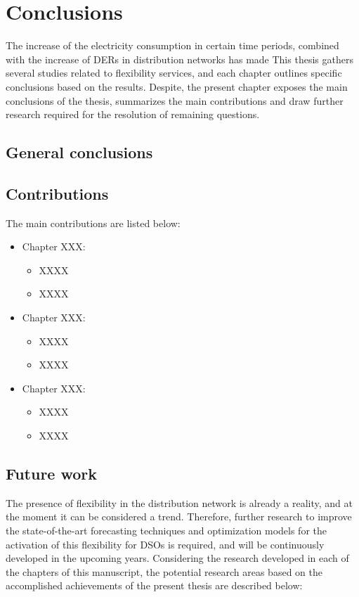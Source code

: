 
\chapter{Conclusions}
\label{conclus}
    The increase of the electricity consumption in certain time periods, combined with the increase of DERs in distribution networks has made 
    This thesis gathers several studies related to flexibility services, and each chapter outlines specific conclusions based on the results. Despite, the present chapter exposes the main conclusions of the thesis, summarizes the main contributions and draw further research required for the resolution of remaining questions. 

\section{General conclusions}
	
    
     
\section{Contributions}
The main contributions are listed below: 
\begin{itemize}
\item Chapter XXX: 
	\begin{itemize}
		\item XXXX
		\item XXXX
	\end{itemize}
\item Chapter XXX: 
	\begin{itemize}
		\item XXXX
		\item XXXX
	\end{itemize}
\item Chapter XXX: 
	\begin{itemize}
		\item XXXX
		\item XXXX
	\end{itemize}
\end{itemize}
	


\section{Future work}
The presence of flexibility in the distribution network is already a reality, and at the moment it can be considered a trend. Therefore, further research to improve the state-of-the-art forecasting techniques and optimization models for the activation of this flexibility for DSOs is required, and will be continuously developed in the upcoming years. 
Considering the research developed in each of the chapters of this manuscript, the potential research areas based on the accomplished achievements of the present thesis are described below: 

